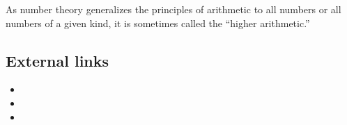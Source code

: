 \documentclass[12pt]{article}
\begin{document}
As number theory generalizes the principles of arithmetic to all numbers or all numbers of a given kind, it is sometimes called the ``higher arithmetic.''

\subsection{External links}
\begin{itemize}
\item {}
\item {}
\item {}
\end{itemize}
\end{document}
